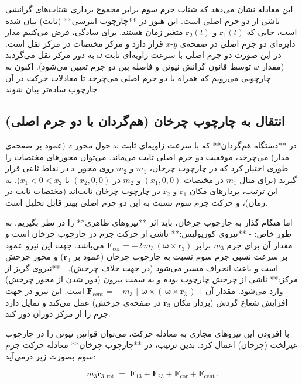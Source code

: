 این معادله نشان می‌دهد که شتاب جرم سوم برابر مجموع برداری شتاب‌های گرانشی ناشی از دو جرم اصلی است. این هنوز در **چارچوب اینرسی** (ثابت) بیان شده است، جایی که \(\mathbf{r}_1(t)\) و \(\mathbf{r}_2(t)\) متغیر زمان هستند. برای سادگی، فرض می‌کنیم مدار دایره‌ای دو جرم اصلی در صفحه‌ی \(x\text{-}y\) قرار دارد و مرکز مختصات در مرکز ثقل است. در این صورت دو جرم اصلی با سرعت زاویه‌ای ثابت \(\omega\) به دور مرکز ثقل می‌گردند (مقدار \(\omega\) توسط قانون گرانش نیوتن و فاصله بین دو جرم تعیین می‌شود). اکنون به چارچوبی می‌رویم که همراه با دو جرم اصلی می‌چرخد تا معادلات حرکت در آن چارچوب ساده‌تر بیان شوند.

\subsection{انتقال به چارچوب چرخان (هم‌گردان با دو جرم اصلی)}

در **دستگاه هم‌گردان** که با سرعت زاویه‌ای ثابت \(\omega\) حول محور \(z\) (عمود بر صفحه‌ی مدار) می‌چرخد، موقعیت دو جرم اصلی ثابت می‌ماند. می‌توان محورهای مختصات را طوری اختیار کرد که در چارچوب چرخان، \(m_1\) و \(m_2\) روی محور \(x\) در نقاط ثابتی قرار گیرند (برای مثال \(m_1\) در مختصات \((x_1,0,0)\) و \(m_2\) در \((x_2,0,0)\) با \(x_1<0<x_2\)). به این ترتیب، بردارهای مکان \(\mathbf{r}_1\) و \(\mathbf{r}_2\) در چارچوب چرخان ثابت‌اند (مختصات ثابت در زمان)، و حرکت جرم سوم نسبت به این دو جرم اصلی بهتر قابل تحلیل است.

اما هنگام گذار به چارچوب چرخان، باید اثر **نیروهای ظاهری** را در نظر بگیریم. به طور خاص: 
- **نیروی کوریولیس:** ناشی از حرکت جرم در چارچوب چرخان است و مقدار آن برای جرم \(m_3\) برابر \( \mathbf{F}_{\text{cor}} = -2\,m_3\,(\boldsymbol{\omega} \times \dot{\mathbf{r}}_{\!3}) \) می‌باشد. جهت این نیرو عمود بر سرعت نسبی جرم سوم نسبت به چارچوب چرخان (عمود بر \(\dot{\mathbf{r}}_3\)) و محور چرخش است و باعث انحراف مسیر می‌شود (در جهت خلاف چرخش).  
- **نیروی گریز از مرکز:** ناشی از چرخش چارچوب بوده و به سمت بیرون (دور شدن از محور چرخش) وارد می‌شود. مقدار آن \( \mathbf{F}_{\text{cent}} = -\,m_3\,[\,\boldsymbol{\omega} \times (\,\boldsymbol{\omega} \times \mathbf{r}_3\,)\,] \) است. این نیرو در جهت افزایش شعاع گردش (بردار مکان \(\mathbf{r}_3\) در صفحه‌ی چرخش) عمل می‌کند و تمایل دارد جرم را از مرکز دوران دور کند.

با افزودن این نیروهای مجازی به معادله حرکت، می‌توان قوانین نیوتن را در چارچوب غیرلخت (چرخان) اعمال کرد. بدین ترتیب، در **چارچوب چرخان** معادله حرکت جرم سوم بصورت زیر درمی‌آید: 

\[ 
m_3 \ddot{\mathbf{r}}_{\!3,\text{rot}} \;=\; \mathbf{F}_{13} + \mathbf{F}_{23} + \mathbf{F}_{\text{cor}} + \mathbf{F}_{\text{cent}}\,. 
\]

